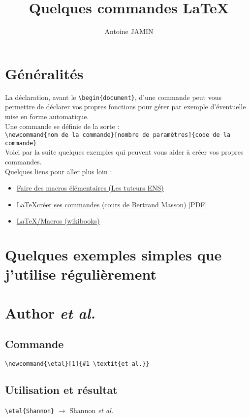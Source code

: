 \documentclass[11pt,a4paper]{article}
\title{Quelques commandes \LaTeX}
\author{Antoine JAMIN}
\newcommand{\etal}[1]{#1 \textit{et al.}}
\begin{document}
\maketitle

\section{Généralités}
La déclaration, avant le \verb|\begin{document}|, d'une commande peut vous permettre de déclarer vos propres fonctions pour gérer par exemple d'éventuelle mise en forme automatique.\\

Une commande se définie de la sorte :\\
\verb|\newcommand{nom de la commande}[nombre de paramètres]{code de la commande}|\\

Voici par la suite quelques exemples qui peuvent vous aider à créer vos propres commandes.\\

Quelques liens pour aller plus loin :\begin{itemize}
	\item \href{https://www.tuteurs.ens.fr/logiciels/latex/macros.html}{Faire des macros élémentaires (Les tuteurs ENS)}
	\item \href{http://bertrandmasson.free.fr/?telechargement/Li4vLi4vZGF0YS9kb2N1bWVudHMvbGF0ZXgvY29tbWFuZGUucGRmKjZmOTAxMg,,}{\LaTeX créer ses commandes (cours de Bertrand Masson) [PDF]}
	\item \href{https://en.wikibooks.org/wiki/LaTeX/Macros}{\LaTeX/Macros (wikibooks)}
\end{itemize}

\section{Quelques exemples simples que j'utilise régulièrement}

\section*{\etal{Author}}
\subsection*{Commande}
\verb|\newcommand{\etal}[1]{#1 \textit{et al.}}|
\subsection*{Utilisation et résultat}
\verb|\etal{Shannon}| $\rightarrow$ \etal{Shannon}
\end{document}
